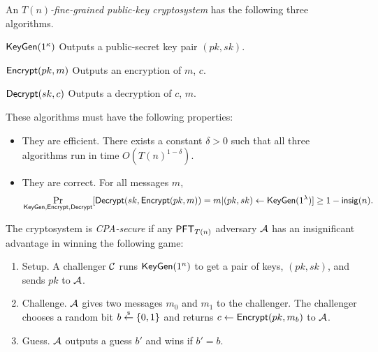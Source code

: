 \begin{definition}\label{def:fg-pkc}
	An \emph{$T(n)$-fine-grained public-key cryptosystem} has the following three algorithms.
	\begin{description}
		\item $\textsf{KeyGen}(1^\kappa)$ Outputs a public-secret key pair $(pk,sk)$.
		\item $\textsf{Encrypt}(pk, m)$ Outputs an encryption of $m$, $c$.
		\item $\textsf{Decrypt}(sk, c)$ Outputs a decryption of $c$, $m$.
	\end{description}
	These algorithms must have the following properties:
	\begin{itemize}
		\item They are efficient. There exists a constant $\delta > 0$ such that all three algorithms run in time $O\left(T(n)^{1-\delta}\right)$.
		\item They are correct. For all messages $m$,
		\[ \Pr_{\textsf{KeyGen},\textsf{Encrypt},\textsf{Decrypt}}[\textsf{Decrypt}(sk, \textsf{Encrypt}(pk,m)) = m \vert (pk,sk) \gets \textsf{KeyGen}(1^\lambda)] \ge 1 - \mathsf{insig}(n). \]
	\end{itemize}

The cryptosystem is \emph{CPA-secure} if any $\mathsf{PFT}_{T(n)}$ adversary $\mathcal{A}$ has an insignificant advantage in winning the following game:
	\begin{enumerate}
		\item Setup. A challenger $\mathcal{C}$ runs $\textsf{KeyGen}(1^n)$ to get a pair of keys, $(pk, sk)$, and sends $pk$ to $\mathcal{A}$.
		\item Challenge. $\mathcal{A}$ gives two messages $m_0$ and $m_1$ to the challenger. The challenger chooses a random bit $b \stackrel{\scriptscriptstyle{\$}}{\gets} \{0,1\}$ and returns $c \gets \textsf{Encrypt}(pk, m_b)$ to $\mathcal{A}$.
		\item Guess. $\mathcal{A}$ outputs a guess $b'$ and wins if $b' = b$.
	\end{enumerate}
\end{definition}
